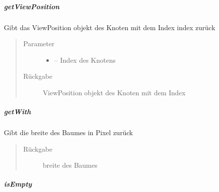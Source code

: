 \documentclass[letterpaper,10pt,ngerman]{sphinxmanual}
\begin{document}
\subparagraph{getViewPosition}
\label{\detokenize{com/linuxluigi/edu/list/Listlabel:getviewposition}}

\begin{fulllineitems}
\label{\detokenize{com/linuxluigi/edu/list/Listlabel:com.linuxluigi.edu.list.Listlabel.getViewPosition(int)}}
Gibt das ViewPosition objekt des Knoten mit dem Index index zurück
\begin{quote}\begin{description}
\item[{Parameter}] \leavevmode\begin{itemize}
\item {} 
 -- Index des Knotens

\end{itemize}

\item[{Rückgabe}] \leavevmode
ViewPosition objekt des Knoten mit dem Index

\end{description}\end{quote}

\end{fulllineitems}



\subparagraph{getWith}
\label{\detokenize{com/linuxluigi/edu/list/Listlabel:getwith}}

\begin{fulllineitems}
\label{\detokenize{com/linuxluigi/edu/list/Listlabel:com.linuxluigi.edu.list.Listlabel.getWith()}}
Gibt die breite des Baumes in Pixel zurück
\begin{quote}\begin{description}
\item[{Rückgabe}] \leavevmode
breite des Baumes

\end{description}\end{quote}

\end{fulllineitems}



\subparagraph{isEmpty}
\label{\detokenize{com/linuxluigi/edu/list/Listlabel:isempty}}
\end{document}
